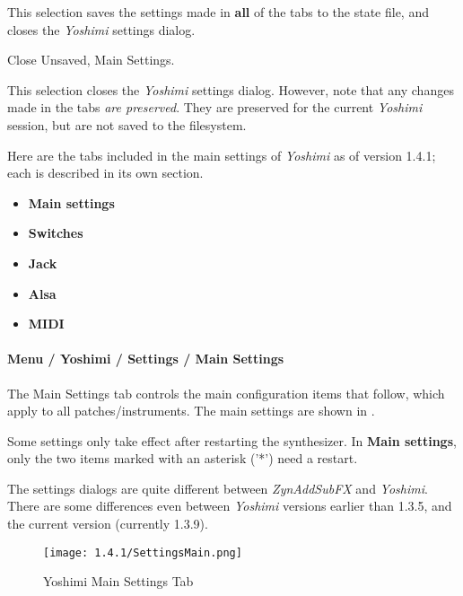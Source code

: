    This selection saves the settings made in \textbf{all} of the tabs to the
   state file, and closes the \textsl{Yoshimi} settings dialog.

   Close Unsaved, Main Settings.

   This selection closes the \textsl{Yoshimi} settings dialog.
   However, note that any changes made in the tabs
   \textsl{are preserved}.  They are preserved for the current
   \textsl{Yoshimi} session, but are not saved to the filesystem.

   Here are the tabs included in the main settings of \textsl{Yoshimi}
   as of version 1.4.1; each is described in its own section.

   \begin{itemize}
      \item \textbf{Main settings}
      \item \textbf{Switches}
      \item \textbf{Jack}
      \item \textbf{Alsa}
      \item \textbf{MIDI}
   \end{itemize}

\paragraph{Menu / Yoshimi / Settings / Main Settings}
\label{paragraph:menu_yoshimi_settings_main_settings}

   The Main Settings tab controls the main configuration items that
   follow, which apply to all patches/instruments.
   The main settings are shown in
   .

   Some settings only take effect after restarting the synthesizer.
   In \textbf{Main settings}, only the two items marked with an asterisk ('*')
   need a restart. 

   The settings dialogs are quite different between \textsl{ZynAddSubFX} and
   \textsl{Yoshimi}.  There are some differences even between
   \textsl{Yoshimi} versions earlier than 1.3.5, and the current version
   (currently 1.3.9).

\begin{figure}[H]
   \centering 
   \texttt{[image: 1.4.1/SettingsMain.png]}
   \caption{Yoshimi Main Settings Tab}
   \label{fig:yoshimi_main_settings_tab}
\end{figure}

